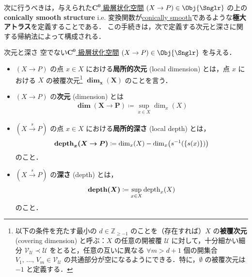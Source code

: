 \documentclass[TQFT_main]{subfiles}
\begin{document}
次に行うべきは，与えられた\hyperref[def:Snglr-C0]{$\bm{C^0}$ 級層状化空間} $(X \to P) \in \Obj{\Snglr}$ の上の\textbf{conically smooth structure} i.e. 変換関数が\hyperref[def:c-smooth-along]{conically smooth}であるような\textbf{極大アトラス}を定義することである．
この手続きは，次で定義する次元と深さに関する帰納法によって構成される．

\begin{mydef}[label=def:dim-depth]{次元と深さ}
    空でない\hyperref[def:Snglr-C0]{$\bm{C^0}$ 級層状化空間} $(X \to P) \in \Obj{\Snglr}$ を与える．
    \begin{itemize}
        \item $(X \to P)$ の点 $x \in X$ における\textbf{局所的次元} (local dimension) とは，点 $x$ における $X$ の被覆次元\footnote{以下の条件を充たす最小の $d \in \mathbb{Z}_{\ge -1}$ のことを（存在すれば）$X$ の\textbf{被覆次元} (covering dimension) と呼ぶ：$X$ の任意の開被覆 $\mathscr{U}$ に対して，十分細かい細分 $\mathscr{V}_{\mathscr{U}} \prec \mathscr{U}$ をとると，任意の互いに異なる $\forall m > d+1$ 個の開集合 $V_1,\, \dots,\, V_{m} \in \mathscr{V}_{\mathscr{U}}$ の共通部分が空になるようにできる．特に，$\emptyset$ の被覆次元は $-1$ と定義する．} $\bm{\dim_x(X)}$ のことを言う．
        \item $(X \to P)$ の\textbf{次元} (dimension) とは
        \begin{align}
            \bm{\dim (X \to P)} \coloneqq \sup_{x \in X} \dim_x (X)
        \end{align}
        \item $(X \xrightarrow{s} P)$ の点 $x \in X$ における\textbf{局所的深さ} (local depth) とは，
        \begin{align}
            \bm{\depth_x(X \to P)} \coloneqq \dim_x (X) - \dim_x \bigl( s^{-1}(\{s(x)\}) \bigr)
        \end{align}
        のこと．
        \item $(X \xrightarrow{s} P)$ の\textbf{深さ} (depth) とは，
        \begin{align}
            \bm{\depth(X)} \coloneqq \sup_{x \in X} \depth_x(X)
        \end{align}
        のこと．
    \end{itemize}
\end{mydef}
\end{document}
